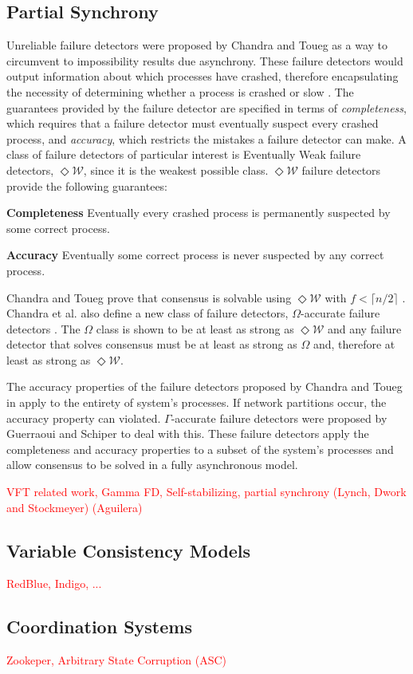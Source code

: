 \documentclass[runningheads,a4paper]{llncs}
\begin{document}
\subsection{Partial Synchrony} \label{Partial Synchrony}

Unreliable failure detectors were proposed by Chandra and Toueg as a way to circumvent to impossibility results due asynchrony. These failure detectors would output information about which processes have crashed, therefore encapsulating the necessity of determining whether a process is crashed or slow \cite{DeepakChandra1996}. The guarantees provided by the failure detector are specified in terms of \textit{completeness}, which requires that a failure detector must eventually suspect every crashed process, and \textit{accuracy}, which restricts the mistakes a failure detector can make. A class of failure detectors of particular interest is Eventually Weak failure detectors, $\Diamond\mathcal{W}$, since it is the weakest possible class. $\Diamond\mathcal{W}$ failure detectors provide the following guarantees:\par
\textbf{Completeness} Eventually every crashed process is permanently suspected by some correct process.\par
\textbf{Accuracy} Eventually some correct process is never suspected by any correct process.\par
Chandra and Toueg prove that consensus is solvable using $\Diamond\mathcal{W}$ with $f < \lceil n/2 \rceil$ \cite{DeepakChandra1996}. Chandra et al. also define a new class of failure detectors, $\Omega$-accurate failure detectors \cite{Chandra1996}. The $\Omega$ class is shown to be at least as strong as $\Diamond\mathcal{W}$ and any failure detector that solves consensus must be at least as strong as $\Omega$ and, therefore at least as strong as $\Diamond\mathcal{W}$. \par
The accuracy properties of the failure detectors proposed by Chandra and Toueg in \cite{DeepakChandra1996} apply to the entirety of system's processes. If network partitions occur, the accuracy property can violated. $\Gamma$-accurate failure detectors were proposed by Guerraoui and Schiper \cite{Guerraoui96gammaaccurate} to deal with this. These failure detectors apply the completeness and accuracy properties to a subset of the system's processes and allow consensus to be solved in a fully asynchronous model.\par


\par
\textcolor{red}{VFT related work, Gamma FD, Self-stabilizing, partial synchrony (Lynch, Dwork and Stockmeyer) (Aguilera)}

\subsection{Variable Consistency Models} \label{Variable Consistency}
\textcolor{red}{RedBlue, Indigo, ...}

\subsection{Coordination Systems} \label{Coordination Systems}
\textcolor{red}{Zookeper, Arbitrary State Corruption (ASC) } 




\end{document}
